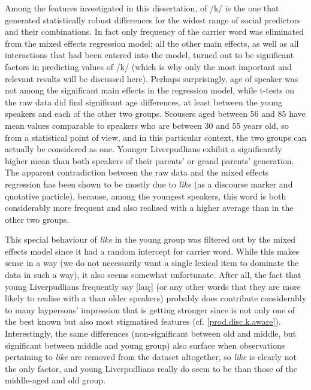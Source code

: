 Among the features investigated in this dissertation,  of /k/ is the one that generated statistically robust differences for the widest range of social predictors and their combinations.
In fact only frequency of the carrier word was eliminated from the mixed effects regression model; all the other main effects, as well as all interactions that had been entered into the model, turned out to be significant factors in predicting  values of /k/ (which is why only the most important and relevant results will be discussed here).
Perhaps surprisingly, age of speaker was not among the significant main effects in the regression model, while t-tests on the raw data did find significant age differences, at least between the young speakers and each of the other two groups.
Scousers aged between 56 and 85 have mean  values comparable to speakers who are between 30 and 55 years old, so from a statistical point of view, and in this particular context, the two groups can actually be considered as one.
Younger Liverpudlians exhibit a significantly higher mean  than both speakers of their parents' or grand parents' generation.
The apparent contradiction between the raw data and the mixed effects regression has been shown to be mostly due to \emph{like} (as a discourse marker and quotative particle), because, among the youngest speakers, this word is both considerably more frequent and also realised with a higher average  than in the other two groups. 

This special behaviour of \emph{like} in the young group was filtered out by the mixed effects model since it had a random intercept for carrier word.
While this makes sense in a way (we do not necessarily want a single lexical item to dominate the data in such a way), it also seems somewhat unfortunate.
After all, the fact that young Liverpudlians frequently say [laɪç] (or any other words that they are more likely to realise with a  than older speakers) probably does contribute considerably to many laypersons' impression that  is getting stronger since  is not only one of the best known but also most stigmatised features (cf. \ref{prod.disc.k.aware}).
Interestingly, the same differences (non-significant between old and middle, but significant between middle and young group) also surface when observations pertaining to \emph{like} are removed from the dataset altogether, so \emph{like} is clearly not the only factor, and young Liverpudlians really do seem to be  than those of the middle-aged and old group.

